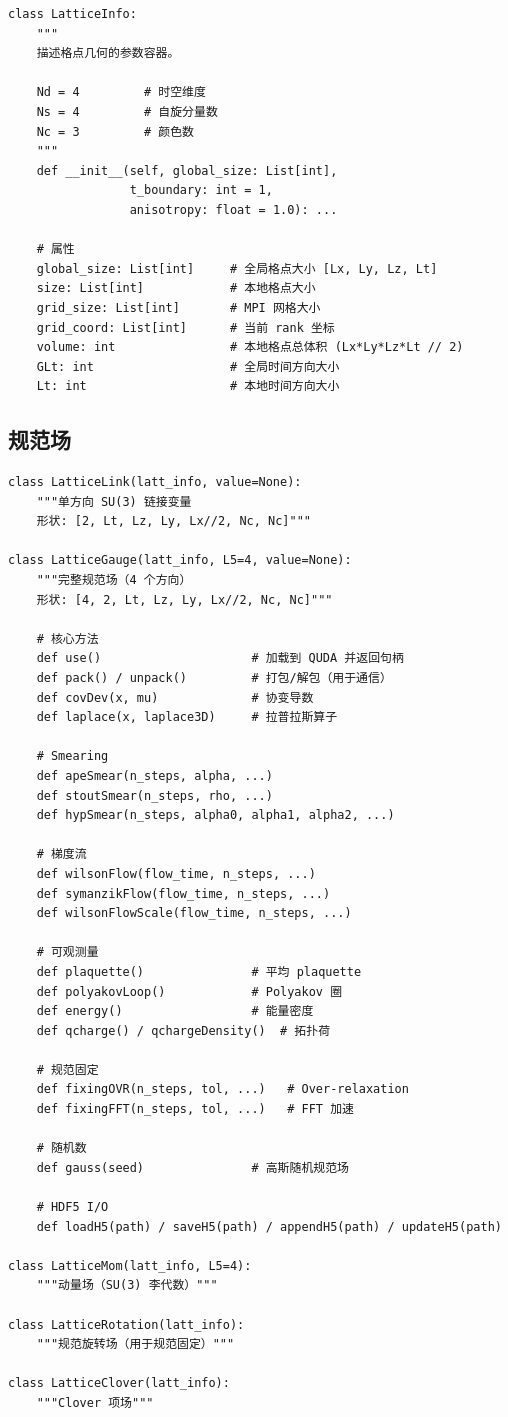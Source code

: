 \documentclass[12pt,a4paper]{ctexart}
\begin{document}
\begin{lstlisting}[style=pycode]
class LatticeInfo:
    """
    描述格点几何的参数容器。

    Nd = 4         # 时空维度
    Ns = 4         # 自旋分量数
    Nc = 3         # 颜色数
    """
    def __init__(self, global_size: List[int],
                 t_boundary: int = 1,
                 anisotropy: float = 1.0): ...

    # 属性
    global_size: List[int]     # 全局格点大小 [Lx, Ly, Lz, Lt]
    size: List[int]            # 本地格点大小
    grid_size: List[int]       # MPI 网格大小
    grid_coord: List[int]      # 当前 rank 坐标
    volume: int                # 本地格点总体积 (Lx*Ly*Lz*Lt // 2)
    GLt: int                   # 全局时间方向大小
    Lt: int                    # 本地时间方向大小
\end{lstlisting}

\subsection{规范场}

\begin{lstlisting}[style=pycode]
class LatticeLink(latt_info, value=None):
    """单方向 SU(3) 链接变量
    形状: [2, Lt, Lz, Ly, Lx//2, Nc, Nc]"""

class LatticeGauge(latt_info, L5=4, value=None):
    """完整规范场（4 个方向）
    形状: [4, 2, Lt, Lz, Ly, Lx//2, Nc, Nc]"""

    # 核心方法
    def use()                     # 加载到 QUDA 并返回句柄
    def pack() / unpack()         # 打包/解包（用于通信）
    def covDev(x, mu)             # 协变导数
    def laplace(x, laplace3D)     # 拉普拉斯算子

    # Smearing
    def apeSmear(n_steps, alpha, ...)
    def stoutSmear(n_steps, rho, ...)
    def hypSmear(n_steps, alpha0, alpha1, alpha2, ...)

    # 梯度流
    def wilsonFlow(flow_time, n_steps, ...)
    def symanzikFlow(flow_time, n_steps, ...)
    def wilsonFlowScale(flow_time, n_steps, ...)

    # 可观测量
    def plaquette()               # 平均 plaquette
    def polyakovLoop()            # Polyakov 圈
    def energy()                  # 能量密度
    def qcharge() / qchargeDensity()  # 拓扑荷

    # 规范固定
    def fixingOVR(n_steps, tol, ...)   # Over-relaxation
    def fixingFFT(n_steps, tol, ...)   # FFT 加速

    # 随机数
    def gauss(seed)               # 高斯随机规范场

    # HDF5 I/O
    def loadH5(path) / saveH5(path) / appendH5(path) / updateH5(path)

class LatticeMom(latt_info, L5=4):
    """动量场（SU(3) 李代数）"""

class LatticeRotation(latt_info):
    """规范旋转场（用于规范固定）"""

class LatticeClover(latt_info):
    """Clover 项场"""
\end{lstlisting}
\end{document}
